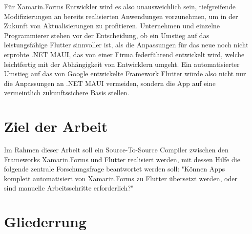 Für Xamarin.Forms Entwickler wird es also unausweichlich sein,  tiefgreifende Modifizierungen an bereits realisierten Anwendungen vorzunehmen,  um in der Zukunft von Aktualisierungen zu profitieren.  Unternehmen und einzelne Programmierer stehen vor der Entscheidung,  ob ein Umstieg auf das leistungsfähige Flutter sinnvoller ist,  als die Anpassungen für das neue noch nicht erprobte .NET MAUI, das von einer Firma federführend entwickelt wird,  welche leichtfertig mit der Abhängigkeit von Entwicklern umgeht.
Ein automatisierter Umstieg auf das von Google entwickelte Framework Flutter würde also nicht nur die Anpassungen an .NET MAUI vermeiden, sondern die App auf eine vermeintlich zukunftssichere Basis stellen.  

\section{Ziel der Arbeit}
Im Rahmen dieser Arbeit soll ein Source-To-Source Compiler zwischen den Frameworks Xamarin.Forms und Flutter realisiert werden, mit dessen Hilfe die folgende zentrale Forschungsfrage beantwortet werden soll: "Können Apps komplett automatisiert von Xamarin.Forms zu Flutter übersetzt werden, oder sind manuelle Arbeitsschritte erforderlich?"


\section{Gliederrung}
